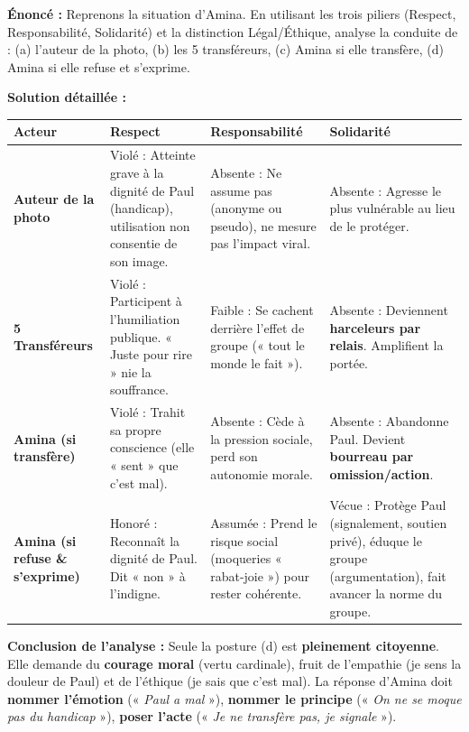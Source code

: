 \documentclass[11pt]{article}
\begin{document}
\begin{exoresolu}
\textbf{Énoncé :} Reprenons la situation d'Amina. En utilisant les trois piliers (Respect, Responsabilité, Solidarité) et la distinction Légal/Éthique, analyse la conduite de : (a) l'auteur de la photo, (b) les 5 transféreurs, (c) Amina si elle transfère, (d) Amina si elle refuse et s'exprime.

\tcblower
\textbf{Solution détaillée :}

\begin{center}
\begin{tabularx}{\linewidth}{|l|X|X|X|}
\hline
\rowcolor{popblueL}
\textbf{Acteur} & \textbf{Respect} & \textbf{Responsabilité} & \textbf{Solidarité} \\
\hline
\textbf{Auteur de la photo} & \textcolor{popred}{Violé} : Atteinte grave à la dignité de Paul (handicap), utilisation non consentie de son image. & \textcolor{popred}{Absente} : Ne assume pas (anonyme ou pseudo), ne mesure pas l'impact viral. & \textcolor{popred}{Absente} : Agresse le plus vulnérable au lieu de le protéger. \\
\hline
\textbf{5 Transféreurs} & \textcolor{popred}{Violé} : Participent à l'humiliation publique. « Juste pour rire » nie la souffrance. & \textcolor{poporange}{Faible} : Se cachent derrière l'effet de groupe (« tout le monde le fait »). & \textcolor{popred}{Absente} : Deviennent \textbf{harceleurs par relais}. Amplifient la portée. \\
\hline
\textbf{Amina (si transfère)} & \textcolor{popred}{Violé} : Trahit sa propre conscience (elle « sent » que c'est mal). & \textcolor{popred}{Absente} : Cède à la pression sociale, perd son autonomie morale. & \textcolor{popred}{Absente} : Abandonne Paul. Devient \textbf{bourreau par omission/action}. \\
\hline
\textbf{Amina (si refuse \& s'exprime)} & \textcolor{popgreen}{Honoré} : Reconnaît la dignité de Paul. Dit « non » à l'indigne. & \textcolor{popgreen}{Assumée} : Prend le risque social (moqueries « rabat-joie ») pour rester cohérente. & \textcolor{popgreen}{Vécue} : Protège Paul (signalement, soutien privé), éduque le groupe (argumentation), fait avancer la norme du groupe. \\
\hline
\end{tabularx}
\end{center}

\textbf{Conclusion de l'analyse :} Seule la posture (d) est \textbf{pleinement citoyenne}. Elle demande du \textbf{courage moral} (vertu cardinale), fruit de l'empathie (je sens la douleur de Paul) et de l'éthique (je sais que c'est mal). La réponse d'Amina doit \textbf{nommer l'émotion} (« \emph{Paul a mal} »), \textbf{nommer le principe} (« \emph{On ne se moque pas du handicap} »), \textbf{poser l'acte} (« \emph{Je ne transfère pas, je signale} »).
\end{exoresolu}
\end{document}
